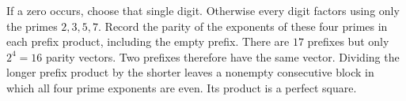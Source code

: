 If a zero occurs, choose that single digit. Otherwise every digit factors using only the primes $2,3,5,7$. Record the parity of the exponents of these four primes in each prefix product, including the empty prefix. There are $17$ prefixes but only $2^4=16$ parity vectors. Two prefixes therefore have the same vector. Dividing the longer prefix product by the shorter leaves a nonempty consecutive block in which all four prime exponents are even. Its product is a perfect square.
